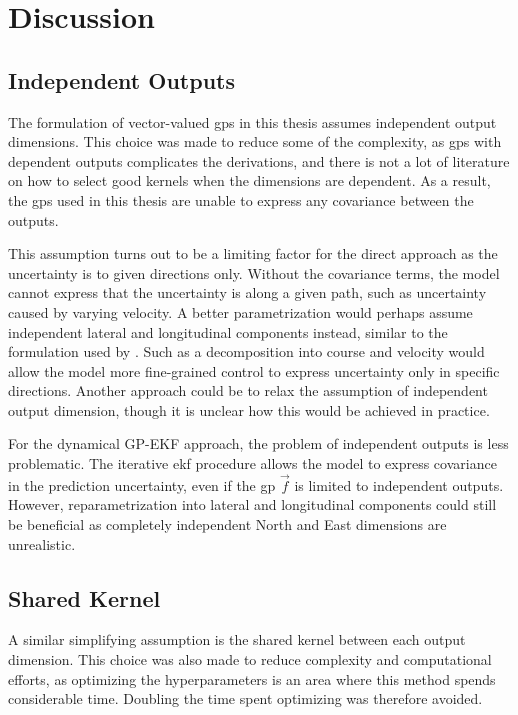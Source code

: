 \chapter{Discussion}\label{chap:discussion}


\section{Independent Outputs}

The formulation of vector-valued \acrshort{gp}s in this thesis assumes independent output dimensions. This choice was made to reduce some of the complexity, as \acrshort{gp}s with dependent outputs complicates the derivations, and there is not a lot of literature on how to select good kernels when the dimensions are dependent. As a result, the \acrshort{gp}s used in this thesis are unable to express any covariance between the outputs. 

This assumption turns out to be a limiting factor for the direct approach as the uncertainty is to given directions only. Without the covariance terms, the model cannot express that the uncertainty is along a given path, such as uncertainty caused by varying velocity. A better parametrization would perhaps assume independent lateral and longitudinal components instead, similar to the formulation used by \cite{gp_ais_trajectory}. Such as a decomposition into course and velocity would allow the model more fine-grained control to express uncertainty only in specific directions. Another approach could be to relax the assumption of independent output dimension, though it is unclear how this would be achieved in practice. 

For the dynamical GP-EKF approach, the problem of independent outputs is less problematic. The iterative \acrshort{ekf} procedure allows the model to express covariance in the prediction uncertainty, even if the \acrshort{gp} $\vec{f}$ is limited to independent outputs. However, reparametrization into lateral and longitudinal components could still be beneficial as completely independent North and East dimensions are unrealistic.  

\section{Shared Kernel}
A similar simplifying assumption is the shared kernel between each output dimension. This choice was also made to reduce complexity and computational efforts, as optimizing the hyperparameters is an area where this method spends considerable time. Doubling the time spent optimizing was therefore avoided. 

